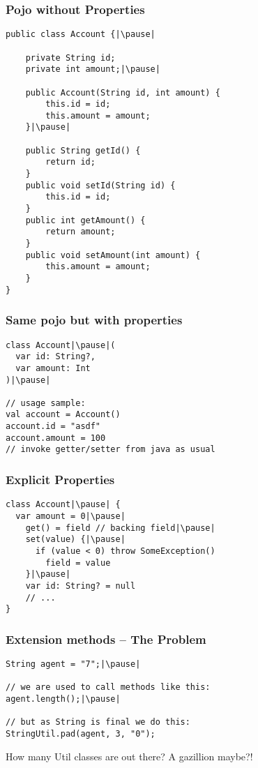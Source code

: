 
\begin{frame}[fragile] \frametitle{Pojo without Properties}
\pause
\begin{lstlisting}[basicstyle=\color{IJ_text}\ttfamily\tiny]
public class Account {|\pause|
    
    private String id;
    private int amount;|\pause|

    public Account(String id, int amount) {
        this.id = id;
        this.amount = amount;
    }|\pause|

    public String getId() {
        return id;
    }
    public void setId(String id) {
        this.id = id;
    }
    public int getAmount() {
        return amount;
    }
    public void setAmount(int amount) {
        this.amount = amount;
    }
}
\end{lstlisting}
\end{frame}

\begin{frame}[fragile] \frametitle{Same pojo but with properties}
\pause
\begin{lstlisting}
class Account|\pause|(
  var id: String?,
  var amount: Int
)|\pause|

// usage sample:
val account = Account()
account.id = "asdf"
account.amount = 100
// invoke getter/setter from java as usual
\end{lstlisting}
\end{frame}

\begin{frame}[fragile] \frametitle{Explicit Properties}
\begin{lstlisting}
class Account|\pause| {
  var amount = 0|\pause|
    get() = field // backing field|\pause|
    set(value) {|\pause|
      if (value < 0) throw SomeException()
        field = value
    }|\pause|
    var id: String? = null
    // ...
}
\end{lstlisting}
\end{frame}


\begin{frame}[fragile] \frametitle{Extension methods -- The Problem}
\pause
\begin{lstlisting}
String agent = "7";|\pause|

// we are used to call methods like this:
agent.length();|\pause|

// but as String is final we do this:
StringUtil.pad(agent, 3, "0");
\end{lstlisting}
\pause
How many Util classes are out there? A gazillion maybe?!
\end{frame}


